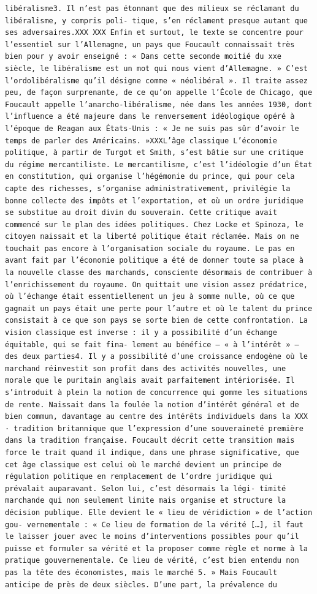 \documentclass[
  letterpaper,
  DIV=11,
  numbers=noendperiod]{scrreprt}
\begin{document}
\begin{verbatim}
libéralisme3. Il n’est pas étonnant que des milieux se réclamant du libéralisme, y compris poli‑ tique, s’en réclament presque autant que ses adversaires.XXX XXX Enfin et surtout, le texte se concentre pour l’essentiel sur l’Allemagne, un pays que Foucault connaissait très bien pour y avoir enseigné : « Dans cette seconde moitié du xxe siècle, le libéralisme est un mot qui nous vient d’Allemagne. » C’est l’ordolibéralisme qu’il désigne comme « néolibéral ». Il traite assez peu, de façon surprenante, de ce qu’on appelle l’École de Chicago, que Foucault appelle l’anarcho‑libéralisme, née dans les années 1930, dont l’influence a été majeure dans le renversement idéologique opéré à l’époque de Reagan aux États‑Unis : « Je ne suis pas sûr d’avoir le temps de parler des Américains. »XXXL’âge classique L’économie politique, à partir de Turgot et Smith, s’est bâtie sur une critique du régime mercantiliste. Le mercantilisme, c’est l’idéologie d’un État en constitution, qui organise l’hégémonie du prince, qui pour cela capte des richesses, s’organise administrativement, privilégie la bonne collecte des impôts et l’exportation, et où un ordre juridique se substitue au droit divin du souverain. Cette critique avait commencé sur le plan des idées politiques. Chez Locke et Spinoza, le citoyen naissait et la liberté politique était réclamée. Mais on ne touchait pas encore à l’organisation sociale du royaume. Le pas en avant fait par l’économie politique a été de donner toute sa place à la nouvelle classe des marchands, consciente désormais de contribuer à l’enrichissement du royaume. On quittait une vision assez prédatrice, où l’échange était essentiellement un jeu à somme nulle, où ce que gagnait un pays était une perte pour l’autre et où le talent du prince consistait à ce que son pays se sorte bien de cette confrontation. La vision classique est inverse : il y a possibilité d’un échange équitable, qui se fait fina‑ lement au bénéfice – « à l’intérêt » – des deux parties4. Il y a possibilité d’une croissance endogène où le marchand réinvestit son profit dans des activités nouvelles, une morale que le puritain anglais avait parfaitement intériorisée. Il s’introduit à plein la notion de concurrence qui gomme les situations de rente. Naissait dans la foulée la notion d’intérêt général et de bien commun, davantage au centre des intérêts individuels dans la XXX · tradition britannique que l’expression d’une souveraineté première dans la tradition française. Foucault décrit cette transition mais force le trait quand il indique, dans une phrase significative, que cet âge classique est celui où le marché devient un principe de régulation politique en remplacement de l’ordre juridique qui prévalait auparavant. Selon lui, c’est désormais la légi‑ timité marchande qui non seulement limite mais organise et structure la décision publique. Elle devient le « lieu de véridiction » de l’action gou‑ vernementale : « Ce lieu de formation de la vérité […], il faut le laisser jouer avec le moins d’interventions possibles pour qu’il puisse et formuler sa vérité et la proposer comme règle et norme à la pratique gouvernementale. Ce lieu de vérité, c’est bien entendu non pas la tête des économistes, mais le marché 5. » Mais Foucault anticipe de près de deux siècles. D’une part, la prévalence du 
\end{verbatim}
\end{document}
